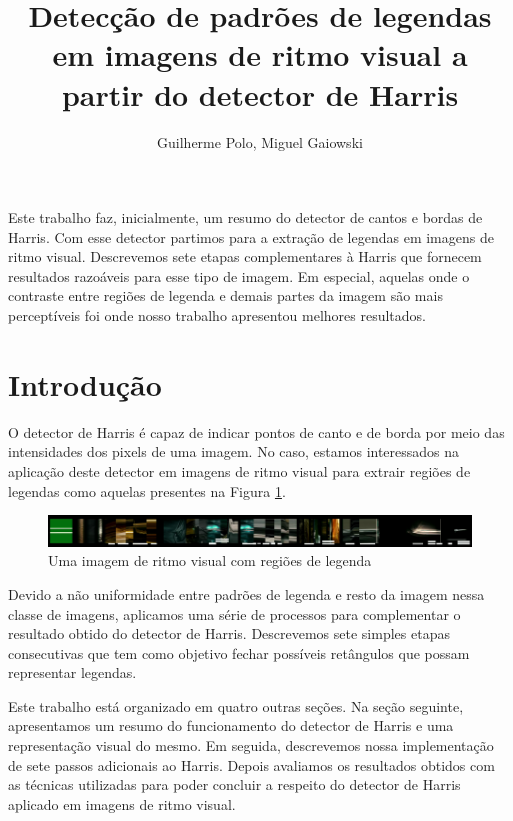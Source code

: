 \documentclass[12pt]{article}
\title{Detecção de padrões de legendas em imagens de ritmo visual a partir
do detector de Harris}
\author{Guilherme Polo\inst{1}, Miguel Gaiowski\inst{1}}
\begin{document}
\maketitle

\begin{resumo}
  Este trabalho faz,  inicialmente, um resumo do detector  de cantos e
  bordas de  Harris.  Com  esse detector partimos  para a  extração de
  legendas  em  imagens  de  ritmo visual.   Descrevemos  sete  etapas
  complementares à Harris que  fornecem resultados razoáveis para esse
  tipo de imagem. Em especial,  aquelas onde o contraste entre regiões
  de legenda e demais partes  da imagem são mais perceptíveis foi onde
  nosso trabalho apresentou melhores resultados.
\end{resumo}


\section{Introdução}

O detector de Harris \cite{harris}  é capaz de indicar pontos de canto
e de  borda por  meio das  intensidades dos pixels  de uma  imagem. No
caso, estamos  interessados na aplicação deste detector  em imagens de
ritmo  visual  \cite{rhythm} para  extrair  regiões  de legendas  como
aquelas presentes na Figura \ref{rhythm}.

\begin{figure}[h!]
  \includegraphics[width=\linewidth]{figs/harrypotter1.png}
  \caption{Uma imagem de ritmo visual com regiões de legenda\label{rhythm}}
\end{figure}

Devido a não  uniformidade entre padrões de legenda  e resto da imagem
nessa  classe  de  imagens,  aplicamos  uma série  de  processos  para
complementar  o resultado  obtido do  detector de  Harris. Descrevemos
sete  simples  etapas  consecutivas   que  tem  como  objetivo  fechar
possíveis retângulos que possam representar legendas.

Este  trabalho  está organizado  em  quatro  outras  seções. Na  seção
seguinte,  apresentamos  um resumo  do  funcionamento  do detector  de
Harris e  uma representação visual do mesmo.   Em seguida, descrevemos
nossa  implementação  de  sete  passos adicionais  ao  Harris.  Depois
avaliamos os resultados obtidos  com as técnicas utilizadas para poder
concluir a respeito do detector de Harris aplicado em imagens de ritmo
visual.
\end{document}
